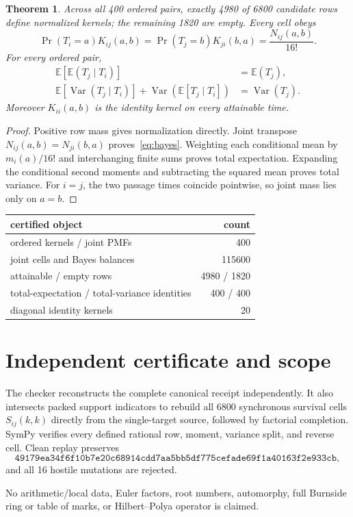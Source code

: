 \documentclass[10pt]{article}
\newtheorem{theorem}{Theorem}
\begin{document}
\begin{theorem}
Across all 400 ordered pairs, exactly 4980 of 6800 candidate rows define
normalized kernels; the remaining 1820 are empty.  Every cell obeys
\begin{equation}
 \Pr(T_i=a)K_{ij}(a,b)
 =\Pr(T_j=b)K_{ji}(b,a)
 =\frac{N_{ij}(a,b)}{16!}.
 \label{eq:bayes}
\end{equation}
For every ordered pair,
\begin{align}
 \mathbb E[\mathbb E(T_j\mid T_i)]&=\mathbb E(T_j),\\
 \mathbb E[\operatorname{Var}(T_j\mid T_i)]
 +\operatorname{Var}(\mathbb E[T_j\mid T_i])&=\operatorname{Var}(T_j).
\end{align}
Moreover $K_{ii}(a,b)$ is the identity kernel on every attainable time.
\end{theorem}
\begin{proof}
Positive row mass gives normalization directly.  Joint transpose
$N_{ij}(a,b)=N_{ji}(b,a)$ proves~\eqref{eq:bayes}.  Weighting each conditional
mean by $m_i(a)/16!$ and interchanging finite sums proves total expectation.
Expanding the conditional second moments and subtracting the squared mean
proves total variance.  For $i=j$, the two passage times coincide pointwise,
so joint mass lies only on $a=b$.
\end{proof}

\begin{center}
\begin{tabular}{lr}
\toprule
certified object & count\\
\midrule
ordered kernels / joint PMFs & 400\\
joint cells and Bayes balances & 115600\\
attainable / empty rows & 4980 / 1820\\
total-expectation / total-variance identities & 400 / 400\\
diagonal identity kernels & 20\\
\bottomrule
\end{tabular}
\end{center}

\section{Independent certificate and scope}
The checker reconstructs the complete canonical receipt independently.  It
also intersects packed support indicators to rebuild all 6800 synchronous
survival cells $S_{ij}(k,k)$ directly from the single-target source, followed
by factorial completion.  SymPy verifies every defined rational row, moment,
variance split, and reverse cell.  Clean replay preserves
\[
\texttt{49179ea34f6f10b7e20c68914cdd7aa5bb5df775cefade69f1a40163f2e933cb},
\]
and all 16 hostile mutations are rejected.

No arithmetic/local data, Euler factors, root numbers, automorphy, full
Burnside ring or table of marks, or Hilbert--Polya operator is claimed.
\end{document}
